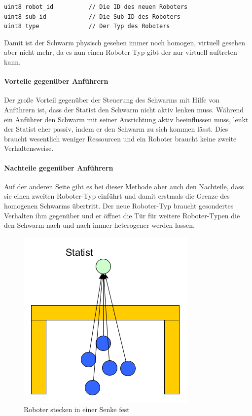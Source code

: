 \begin{lstlisting}[style=ros, title=Nachrichten-Typ: New\_Robot.msg]
uint8 robot_id			// Die ID des neuen Roboters
uint8 sub_id			// Die Sub-ID des Roboters
uint8 type				// Der Typ des Roboters
\end{lstlisting}

Damit ist der Schwarm physisch gesehen immer noch homogen, virtuell gesehen aber nicht mehr, da es nun einen Roboter-Typ gibt der nur virtuell auftreten kann.

\paragraph*{Vorteile gegenüber Anführern}
Der große Vorteil gegenüber der Steuerung des Schwarms mit Hilfe von Anführern ist, dass der Statist den Schwarm nicht aktiv lenken muss. Während ein Anführer den Schwarm mit seiner Ausrichtung aktiv beeinflussen muss, lenkt der Statist eher passiv, indem er den Schwarm zu sich kommen lässt. Dies braucht wesentlich weniger Ressourcen und ein Roboter braucht keine zweite Verhaltensweise.

\paragraph*{Nachteile gegenüber Anführern}
Auf der anderen Seite gibt es bei dieser Methode aber auch den Nachteile, dass sie einen zweiten Roboter-Typ einführt und damit erstmals die Grenze des homogenen Schwarms übertritt. Der neue Roboter-Typ braucht gesondertes Verhalten ihm gegenüber und er öffnet die Tür für weitere Roboter-Typen die den Schwarm nach und nach immer heterogener werden lassen.\\

\begin{figure}
	\includegraphics[width=\pictureWidth,keepaspectratio]{graphics/StatistSenke.png}
	\caption{Roboter stecken in einer Senke fest}
	\label{pic:StatistSenke}
\end{figure}

